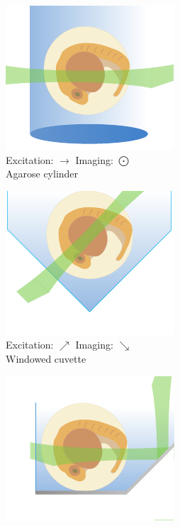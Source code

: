 %
\begin{figure}
    \centering
    \begin{subfigure}[b]{0.4\linewidth}
         \centering
        \includegraphics{mounting_strategies_fish_cartoon/fep}
        \captionsetup{justification=centering}
         \caption{Excitation: \(\rightarrow\) \quad  Imaging: \(\bigodot\) \\ Agarose cylinder}
    \end{subfigure}
    \begin{subfigure}[b]{0.4\linewidth}
             \centering
        \includegraphics{mounting_strategies_fish_cartoon/cuvette}
        \captionsetup{justification=centering}
         \caption{Excitation: \(\nearrow\) \quad  Imaging: \(\searrow\) \\ Windowed cuvette}
    \end{subfigure}
    \begin{subfigure}[b]{0.4\linewidth}
             \centering
        \includegraphics{mounting_strategies_fish_cartoon/mirrored}

\end{subfigure}
\end{figure}
